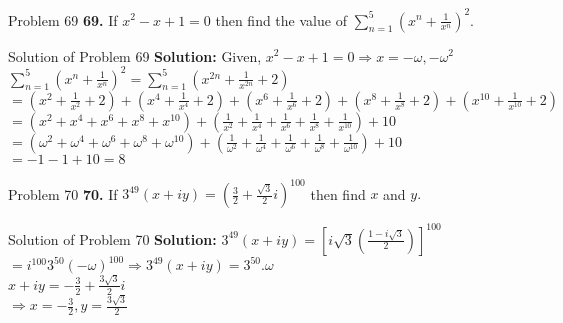 \documentclass[aspectratio=169,8pt]{beamer}
\begin{document}
\begin{frame}{Problem 69}
  \textbf{69.} If $x^2 - x + 1 = 0$ then find the value of $\sum_{n = 1}^5\left(x^n + \frac{1}{x^n}\right)^2.$
\end{frame}
\begin{frame}{Solution of Problem 69}
  \textbf{Solution:} Given, $x^2 - x + 1 = 0\Rightarrow x = -\omega, -\omega^2$\\
  \vspace*{0.2cm}
  $\sum_{n = 1}^5\left(x^n + \frac{1}{x^n}\right)^2 = \sum_{n = 1}^5\left(x^{2n} + \frac{1}{x^{2n}} + 2\right)$\\
  \vspace*{0.2cm}
  $= \left(x^2 + \frac{1}{x^2} + 2\right) + \left(x^4 + \frac{1}{x^4} + 2\right) + \left(x^6 + \frac{1}{x^6} + 2\right) + \left(x^8 + \frac{1}{x^8} + 2\right) + \left(x^{10} + \frac{1}{x^{10}} + 2\right)$\\
  \vspace*{0.2cm}
  $= (x^2 + x^4 + x^6 + x^8 + x^{10}) + \left(\frac{1}{x^2} + \frac{1}{x^4} + \frac{1}{x^6} + \frac{1}{x^8} + \frac{1}{x^{10}}\right) + 10$\\
  \vspace*{0.2cm}
  $= (\omega^2 + \omega^4 + \omega^6 + \omega^8 + \omega^{10}) + \left(\frac{1}{\omega^2} + \frac{1}{\omega^4} + \frac{1}{\omega^6} + \frac{1}{\omega^8} + \frac{1}{\omega^{10}}\right) + 10$\\
  \vspace*{0.2cm}
  $= -1 - 1 + 10 = 8$
\end{frame}
\begin{frame}{Problem 70}
  \textbf{70.}  If $3^{49}(x + iy) = \left(\frac{3}{2} + \frac{\sqrt{3}}{2}i\right)^{100}$ then find $x$ and $y.$
\end{frame}
\begin{frame}{Solution of Problem 70}
  \textbf{Solution:} $3^{49}(x + iy) = \left[i\sqrt{3}\left(\frac{1 - i\sqrt{3}}{2}\right)\right]^{100}$\\
  \vspace*{0.2cm}
  $= i^{100}3^{50}(-\omega)^{100} \Rightarrow 3^{49}(x + iy) = 3^{50}.\omega$\\
  \vspace*{0.2cm}
  $x + iy = -\frac{3}{2} + \frac{3\sqrt{3}}{2}i$\\
  \vspace*{0.2cm}
  $\Rightarrow x = -\frac{3}{2}, y = \frac{3\sqrt{3}}{2}$
\end{frame}
\end{document}
